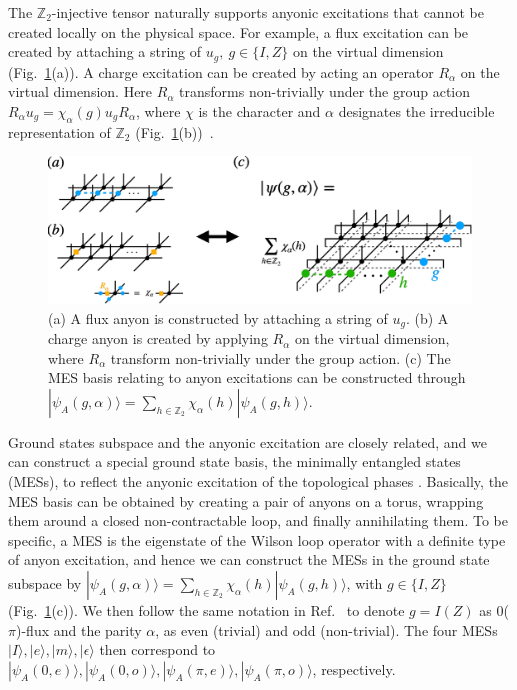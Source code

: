 \documentclass{ntuthesis}
\newcommand{\citep}{\cite}
\begin{document}
The $\mathbb{ Z}_2$-injective tensor naturally supports anyonic excitations that cannot be created locally on the physical space. 
%
For example, a flux excitation can be created by attaching a string of $u_g,\ g\in \{{I}, Z\}$ on the virtual dimension (Fig.~\ref{fig:anyon_MES}(a)).
%
A charge excitation can be created by acting an operator $R_\alpha$ on the virtual dimension. Here $R_\alpha$ transforms non-trivially under the group action $R_\alpha u_g = \chi_\alpha(g) u_g R_\alpha$, where $\chi$ is the character and $\alpha$ designates the irreducible representation of  $\mathbb{Z}_2$ (Fig.~\ref{fig:anyon_MES}(b))~\citep{2011_Norbert_Ginjective,2017_anyon_condensates}. 


\begin{figure}[t]
\centering
\includegraphics[width=\linewidth]{anyon_MES}
\caption{(a) A flux anyon is constructed by attaching a string of $u_g$. (b) A charge anyon is created by applying $R_\alpha$ on the virtual dimension, where $R_\alpha$ transform non-trivially under the group action. (c) The MES basis relating to anyon excitations can be constructed through $|\psi_A(g, \alpha)\rangle = \sum_{h \in \mathbb{Z}_2 }\chi_\alpha(h) |\psi_A(g,h) \rangle$. }
\label{fig:anyon_MES}
\end{figure}

Ground states subspace and the anyonic excitation are closely related, and we can construct a special ground state basis, the minimally entangled states (MESs), to reflect the anyonic excitation of the topological phases \cite{2012-PRB-Oshikawa-MES}. 
%
Basically, the MES basis can be obtained by creating a pair of anyons on a torus, wrapping them around a closed non-contractable loop, and finally annihilating them. 
%
To be specific, a MES is the eigenstate of the Wilson loop operator with a definite type of anyon excitation, and hence we can construct the MESs in the ground state subspace by  $|\psi_A(g, \alpha)\rangle = \sum_{h \in \mathbb{Z}_2 }\chi_\alpha(h) |\psi_A(g,h) \rangle$, with $g\in \{{I}, Z\}$ (Fig.~\ref{fig:anyon_MES}(c)). 
%
We then follow the same notation in Ref.~\cite{Norbert_Schuch_2013} to denote $g = {I} (Z)$ as 0($\pi$)-flux and the parity $\alpha $, as even (trivial) and odd (non-trivial).   
%
The four MESs $|I\rangle ,|e \rangle, |m \rangle, |\epsilon\rangle $ then correspond to  $|\psi_A(0,e)\rangle,|\psi_A(0,o)\rangle,|\psi_A(\pi,e)\rangle,|\psi_A(\pi,o)\rangle $, respectively.
\end{document}
